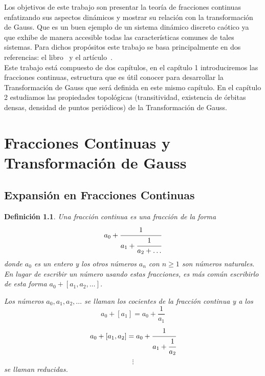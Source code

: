 \documentclass[12pt]{report}
\newtheorem{defi}{Definición}[section]
\begin{document}
Los objetivos de este trabajo son presentar la teoría de fracciones continuas enfatizando sus aspectos dinámicos y mostrar su relación  con la transformación de Gauss. Que es un buen ejemplo de un sistema dinámico discreto caótico ya que exhibe de manera accesible todas las características comunes de tales sistemas. Para dichos propósitos este trabajo se basa principalmente en dos referencias: el libro~\cite{Portugues} y el artículo~\cite{chaos}.
\\

Este trabajo está compuesto de dos capítulos, en el capítulo 1 introduciremos las fracciones continuas, estructura que es útil conocer para desarrollar la Transformación de Gauss que será definida en este mismo capítulo. En el capítulo 2 estudiamos las propiedades topológicas (transitividad, existencia de órbitas densas, densidad de puntos periódicos) de la Transformación de Gauss.












\chapter{Fracciones Continuas y Transformación de Gauss}
\section{Expansión en Fracciones Continuas}
\begin{defi}
Una fracción continua es una fracción de la forma
$$
a_{0}+\cfrac{1}{a_{1} + \cfrac{1}{a_{2} + \ldots}}
$$
donde $a_{0}$ es un entero y los otros números $a_{n}$ con $n\geq1$ son números naturales.
\\

En lugar de escribir un número usando estas fracciones, es más común escribirlo de esta forma $a_{0}+[a_{1}, a_{2}, \ldots]$.

Los números $a_{0},a_{1},a_{2},\ldots$ se llaman los cocientes de la fracción continua y a los 
$$a_{0}+[a_{1}]=a_{0}+\frac{1}{a_{1}}$$
$$a_{0}+[a_{1},a_{2}]=a_{0}+\cfrac{1}{a_{1}+\cfrac{1}{a_{2}}}
$$
$$
\vdots
$$
se llaman reducidas.
\end{defi}
\end{document}
